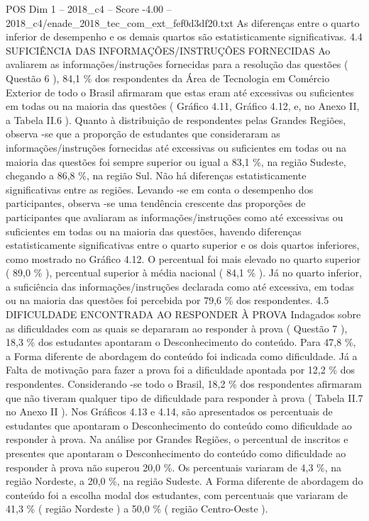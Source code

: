 \begin{textsample}{POS Dim 1 – 2018\_c4 – Score -4.00 – 2018\_c4/enade\_2018\_tec\_com\_ext\_fef0d3df20.txt}
As diferenças entre o quarto inferior de desempenho e os demais quartos são estatisticamente significativas. 4.4 SUFICIÊNCIA DAS INFORMAÇÕES/INSTRUÇÕES FORNECIDAS Ao avaliarem as informações/instruções fornecidas para a resolução das questões ( Questão 6 ), 84,1 \% dos respondentes da Área de Tecnologia em Comércio Exterior de todo o Brasil afirmaram que estas eram até excessivas ou suficientes em todas ou na maioria das questões ( Gráfico 4.11, Gráfico 4.12, e, no Anexo II, a Tabela II.6 ).
Quanto à distribuição de respondentes pelas Grandes Regiões, observa -se que a proporção de estudantes que consideraram as informações/instruções fornecidas até excessivas ou suficientes em todas ou na maioria das questões foi sempre superior ou igual a 83,1 \%, na região Sudeste, chegando a 86,8 \%, na região Sul.
Não há diferenças estatisticamente significativas entre as regiões.
Levando -se em conta o desempenho dos participantes, observa -se uma tendência crescente das proporções de participantes que avaliaram as informações/instruções como até excessivas ou suficientes em todas ou na maioria das questões, havendo diferenças estatisticamente significativas entre o quarto superior e os dois quartos inferiores, como mostrado no Gráfico 4.12.
O percentual foi mais elevado no quarto superior ( 89,0 \% ), percentual superior à média nacional ( 84,1 \% ).
Já no quarto inferior, a suficiência das informações/instruções declarada como até excessiva, em todas ou na maioria das questões foi percebida por 79,6 \% dos respondentes. 4.5 DIFICULDADE ENCONTRADA AO RESPONDER À PROVA Indagados sobre as dificuldades com as quais se depararam ao responder à prova ( Questão 7 ), 18,3 \% dos estudantes apontaram o Desconhecimento do conteúdo.
Para 47,8 \%, a Forma diferente de abordagem do conteúdo foi indicada como dificuldade.
Já a Falta de motivação para fazer a prova foi a dificuldade apontada por 12,2 \% dos respondentes.
Considerando -se todo o Brasil, 18,2 \% dos respondentes afirmaram que não tiveram qualquer tipo de dificuldade para responder à prova ( Tabela II.7 no Anexo II ).
Nos Gráficos 4.13 e 4.14, são apresentados os percentuais de estudantes que apontaram o Desconhecimento do conteúdo como dificuldade ao responder à prova.
Na análise por Grandes Regiões, o percentual de inscritos e presentes que apontaram o Desconhecimento do conteúdo como dificuldade ao responder à prova não superou 20,0 \%.
Os percentuais variaram de 4,3 \%, na região Nordeste, a 20,0 \%, na região Sudeste.
A Forma diferente de abordagem do conteúdo foi a escolha modal dos estudantes, com percentuais que variaram de 41,3 \% ( região Nordeste ) a 50,0 \% ( região Centro-Oeste ).

\end{textsample}
